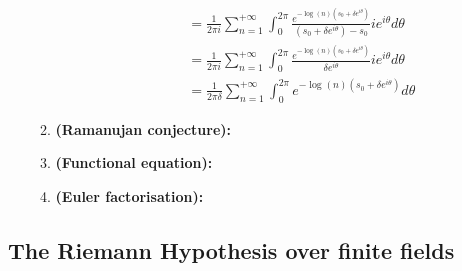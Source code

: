 \begin{example}
\begin{enumerate}
\begin{enumerate}
\begin{enumerate}
$$\begin{aligned}
                                                    & = \frac{1}{2\pi i} \sum_{n = 1}^{+\infty} \int_0^{2\pi} \frac{e^{-\log(n) (s_0 + \delta e^{i\theta})}}{(s_0 + \delta e^{i\theta}) - s_0} ie^{i\theta} d\theta 
                                                    \\
                                                    & = \frac{1}{2\pi i} \sum_{n = 1}^{+\infty} \int_0^{2\pi} \frac{e^{-\log(n) (s_0 + \delta e^{i\theta})}}{\delta e^{i\theta}} ie^{i\theta} d\theta
                                                    \\
                                                    & = \frac{1}{2\pi \delta} \sum_{n = 1}^{+\infty} \int_0^{2\pi} e^{-\log(n) (s_0 + \delta e^{i\theta})} d\theta
                                                \end{aligned}
                                            $$
                                    \end{enumerate}
                                \item \textbf{(Ramanujan conjecture):}
                                \item \textbf{(Functional equation):}
                                \item \textbf{(Euler factorisation):}
                            \end{enumerate}
                    \end{enumerate} 
                \end{example}
        
        \subsection{The Riemann Hypothesis over finite fields}
        
    